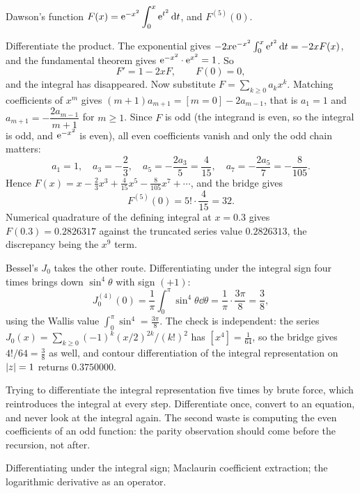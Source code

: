 \begin{worked}
Dawson's function $F(x)=\mathrm{e}^{-x^{2}}\displaystyle\int_{0}^{x}\mathrm{e}^{t^{2}}\,\mathrm{d} t$, and $F^{(5)}(0)$.

Differentiate the product. The exponential gives $-2x\mathrm{e}^{-x^{2}}\int_{0}^{x}\mathrm{e}^{t^{2}}\,\mathrm{d} t=-2xF(x)$, and the fundamental theorem gives $\mathrm{e}^{-x^{2}}\cdot\mathrm{e}^{x^{2}}=1$. So
\[
F'=1-2xF,\qquad F(0)=0,
\]
and the integral has disappeared. Now substitute $F=\sum_{k\geq0}a_{k}x^{k}$. Matching coefficients of $x^{m}$ gives $(m+1)a_{m+1}=[m=0]-2a_{m-1}$, that is $a_{1}=1$ and $a_{m+1}=-\dfrac{2a_{m-1}}{m+1}$ for $m\geq1$. Since $F$ is odd (the integrand is even, so the integral is odd, and $\mathrm{e}^{-x^{2}}$ is even), all even coefficients vanish and only the odd chain matters:
\[
a_{1}=1,\quad a_{3}=-\frac{2}{3},\quad a_{5}=-\frac{2a_{3}}{5}=\frac{4}{15},\quad a_{7}=-\frac{2a_{5}}{7}=-\frac{8}{105}.
\]
Hence $F(x)=x-\tfrac23x^{3}+\tfrac4{15}x^{5}-\tfrac8{105}x^{7}+\cdots$, and the bridge gives
\[
F^{(5)}(0)=5!\cdot\frac{4}{15}=32 .
\]
Numerical quadrature of the defining integral at $x=0.3$ gives $F(0.3)=0.2826317$ against the truncated series value $0.2826313$, the discrepancy being the $x^{9}$ term.

Bessel's $J_{0}$ takes the other route. Differentiating under the integral sign four times brings down $\sin^{4}\theta$ with sign $(+1)$:
\[
J_{0}^{(4)}(0)=\frac1\pi\int_{0}^{\pi}\sin^{4}\theta\dd\theta=\frac1\pi\cdot\frac{3\pi}{8}=\frac38 ,
\]
using the Wallis value $\int_{0}^{\pi}\sin^{4}=\tfrac{3\pi}{8}$. The check is independent: the series $J_{0}(x)=\sum_{k\geq0}(-1)^{k}(x/2)^{2k}/(k!)^{2}$ has $[x^{4}]=\tfrac{1}{64}$, so the bridge gives $4!/64=\tfrac38$ as well, and contour differentiation of the integral representation on $\left\lvert z\right\rvert=1$ returns $0.3750000$.
\end{worked}

\begin{trap}
Trying to differentiate the integral representation five times by brute force, which reintroduces the integral at every step. Differentiate once, convert to an equation, and never look at the integral again. The second waste is computing the even coefficients of an odd function: the parity observation should come before the recursion, not after.
\end{trap}

\begin{seealsob}Differentiating under the integral sign; Maclaurin coefficient extraction; the logarithmic derivative as an operator.\end{seealsob}

